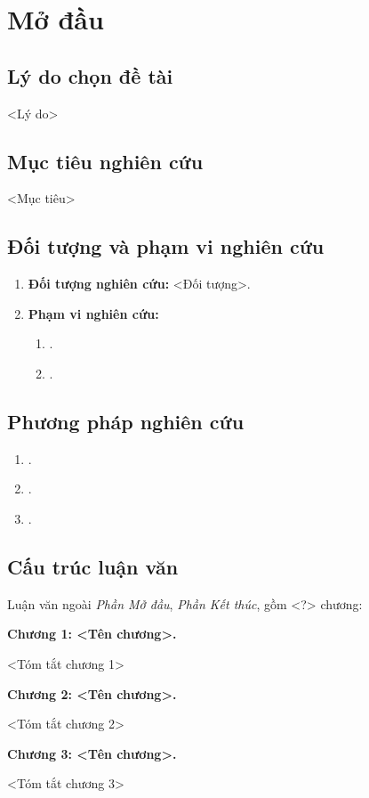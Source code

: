 \chapter*{Mở đầu}

\section{Lý do chọn đề tài}
<Lý do>
\section{Mục tiêu nghiên cứu}
<Mục tiêu>
\section{Đối tượng và phạm vi nghiên cứu}
\begin{enumerate}[label=\textbf{\thesection.\arabic*},align=left,left=0cm..1cm]
	\item \textbf{Đối tượng nghiên cứu:} <Đối tượng>.\par
	\item \textbf{Phạm vi nghiên cứu:}
	\begin{enumerate}[label=$-$,align=left,left=0cm..0cm,itemindent=*]
		\item <Phạm vi 1>.
		\item <Phạm vi 2>.
	\end{enumerate}
\end{enumerate}\par

\section{Phương pháp nghiên cứu}
\begin{enumerate}[label=$-$,align=left,left=1cm..0cm,itemindent=*]
	\item <Phương pháp 1>.
	\item <Phương pháp 2>.
	\item <Phương pháp 3>.
\end{enumerate}

\section{Cấu trúc luận văn}
Luận văn ngoài \textit{Phần Mở đầu}, \textit{Phần Kết thúc}, gồm <?> chương:\par
\textbf{Chương 1: <Tên chương>.}\par
<Tóm tắt chương 1>\par
\textbf{Chương 2: <Tên chương>.}\par
<Tóm tắt chương 2>\par
\textbf{Chương 3: <Tên chương>.}\par
<Tóm tắt chương 3>\par
